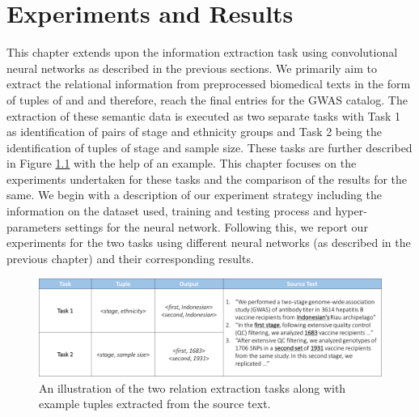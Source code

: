 
\chapter{Experiments and Results}
\label{chapter:experiments-and-results}
This chapter extends upon the information extraction task using convolutional neural networks as described in the previous sections. We primarily aim to extract the relational information from preprocessed biomedical texts in the form of tuples of {\it <stage, ethnicity>} and {\it <stage, sample size>} and therefore, reach the final entries for the GWAS catalog. The extraction of these semantic data is executed as two separate tasks with Task 1 as identification of pairs of stage and ethnicity groups and Task 2 being the identification of tuples of stage and sample size. These tasks are further described in Figure \ref{figure:task-example} with the help of an example. This chapter focuses on the experiments undertaken for these tasks and the comparison of the results for the same. We begin with a description of our experiment strategy including the information on the dataset used, training and testing process and hyper-parameters settings for the neural network. Following this, we report our experiments for the two tasks using different neural networks (as described in the previous chapter) and their corresponding results.

\begin{figure}[ht]
    \centering
    \includegraphics[width=0.85\linewidth]{Images/Task-Example.png}
    \caption{An illustration of the two relation extraction tasks along with example tuples extracted from the source text.}
    \label{figure:task-example}
\end{figure}

